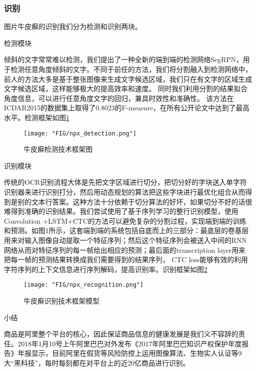 \subsubsection{识别}

图片牛皮癣的识别我们分为检测和识别两块。

\begin{bfseries} 
	检测模块
\end{bfseries}

倾斜的文字常常难以检测，我们提出了一种全新的端到端的检测网络SegRPN，用于检测任意角度倾斜的文字。不同于前任的方法，我们将分割融入到检测网络中，前人的方法大多是基于整张图像来生成文字候选区域，我们只在有文字的区域生成文字候选区域，这样能够极大的提高效率和速度。 同时我们利用分割的结果拟合角度信息，可以进行任意角度文字的回归，兼具时效性和准确性。 该方法在ICDAR2015的数据集上取得了0.8023的F-measure，在所有公开论文中达到了最高水平。检测框架如图\ref{fig:chap12_npx_detection}

\begin{figure}
	\centering
	\texttt{[image: "FIG/npx\_detection.png"]}
	\caption{牛皮癣检测技术框架图}
	\label{fig:chap12_npx_detection}
\end{figure}

\begin{bfseries} 
	识别模块
\end{bfseries}

传统的OCR识别流程大体是先把文字区域进行切分，把切分好的字块送入单字符识别器来进行识别打分，然后用动态规划的算法把这些字块进行最优化组合从而得到是别的文本行答案。这种方法十分依赖于切分算法的好坏，如果切分不好的话很难得到准确的识别结果。我们尝试使用了基于序列学习的整行识别模型，使用Convolution +LSTM+CTC的方法可以避免复杂的分割过程，实现端到端的训练和预测。如图1所示，这套端到端的系统包括自底而上的三部分：最底层的卷基层用来对输入图像自动提取一个特征序列；然后这个特征序列会被送入中间的RNN网络从而对特征序列的每一帧给出相应的预测；最后面的transcription layer用来把每一帧的预测结果转换成我们需要得到的结果序列， CTC loss能够有效的利用字符序列的上下文信息进行序列解码，提高识别率。识别框架如图\ref{fig:chap12_npx_recognition}

\begin{figure}
	\centering
	\texttt{[image: "FIG/npx\_recognition.png"]}
	\caption{牛皮癣识别技术框架模型}
	\label{fig:chap12_npx_recognition}
\end{figure}

\begin{bfseries} 
小结\\
\end{bfseries}
商品是阿里整个平台的核心，因此保证商品信息的健康发展是我们义不容辞的责任。2018年1月10号上午阿里巴巴对外发布《2017年阿里巴巴知识产权保护年度报告》年报显示，目前阿里在假货等风险防控上运用图像算法、生物实人认证等9大“黑科技”，每时每刻都在对平台上的近20亿商品进行识别。

